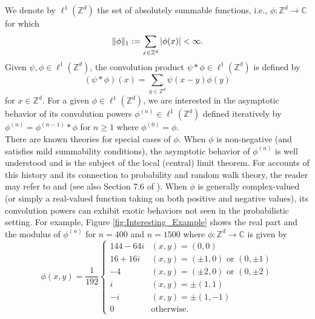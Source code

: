\documentclass[11pt, letter]{book}
\begin{document}
\noindent We denote by $\ell^1(\mathbb{Z}^d)$ the set of absolutely summable functions, i.e., $\phi:\mathbb{Z}^d\to\mathbb{C}$ for which
\begin{equation*}
\|\phi\|_1:=\sum_{x\in\mathbb{Z}^d}\abs{\phi(x)}<\infty.
\end{equation*}
Given $\psi,\phi\in \ell^1(\mathbb{Z}^d)$, the convolution product $\psi\ast\phi\in\ell^1(\mathbb{Z}^d)$ is defined by
\begin{equation*}
\left(\psi\ast\phi\right)(x)=\sum_{y\in\mathbb{Z}^d}\psi(x-y)\phi(y)
\end{equation*}
for $x\in\mathbb{Z}^d$. For a given $\phi\in\ell^1(\mathbb{Z}^d)$, we are interested in the asymptotic behavior of its convolution powers $\phi^{(n)}\in\ell^1(\mathbb{Z}^d)$ defined iteratively by $\phi^{(n)}=\phi^{(n-1)}\ast\phi$ for $n\geq 1$ where $\phi^{(0)}=\phi$. \\


\noindent There are known theories for special cases of $\phi$. When $\phi$ is non-negative (and satisfies mild summability conditions), the asymptotic behavior of $\phi^{(n)}$ is well understood and is the subject of the local (central) limit theorem. For accounts of this history and its connection to probability and random walk theory, the reader may refer to \cite{lawler_random_2010} and \cite{spitzer_principles_1964} (see also Section 7.6 of \cite{randles_convolution_2017}). When $\phi$ is generally complex-valued (or simply a real-valued function taking on both positive and negative values), its convolution powers can exhibit exotic behaviors not seen in the probabilistic setting. For example, Figure \ref{fig:Interesting_Example} shows the real part and the modulus of $\phi^{(n)}$ for $n = 400$ and $n = 1500$ where $\phi: \mathbb{Z}^d \to \mathbb{C}$ is given by 
\begin{equation*}
    \phi(x,y) =
    \frac{1}{192}
    \begin{cases}
    144 - 64i &(x,y) = (0,0)\\
    16 + 16i &(x,y) = (\pm 1, 0)\mbox{ or }(0,\pm 1)\\
    -4        &(x,y) = (\pm 2,0)\mbox{ or }(0,\pm 2)\\
    i   &(x,y) = \pm(1,1)\\
    -i   &(x,y) = \pm(1,-1)\\
    0& \text{otherwise}.
    \end{cases}
\end{equation*}
\end{document}
